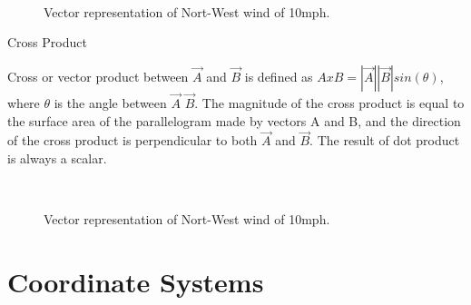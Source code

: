 \begin{description}
\begin{figure}[htbp]
\begin{center}
\strut{} \\
\end{center}
\caption{Vector representation of Nort-West wind of 10mph.}
\label{wind}
\end{figure}

\item{Cross Product}

Cross or vector product between  $\vec{A}$ and $\vec{B}$ is defined as $A x B = |\vec{A}| |\vec{B}| sin(\theta)$, where $\theta$ is the angle between $\vec{A}$ $\vec{B}$. The magnitude of the cross product is equal to the surface area of the parallelogram made by vectors A and B, and the direction of the cross product is perpendicular to both $\vec{A}$ and $\vec{B}$. The result of dot product is always a scalar.


\begin{figure}[htbp]
\begin{center}
\strut{} \\
\end{center}
\caption{Vector representation of Nort-West wind of 10mph.}
\label{wind}
\end{figure}


\end{description}

\section{Coordinate Systems}

